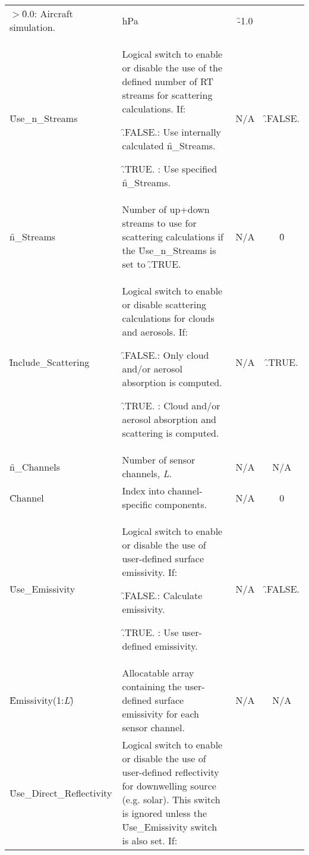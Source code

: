 \begin{longtable}{l p{8.5cm} c c}
{                 \hspace{0.5cm}$>$\f{0.0}: Aircraft simulation.\\}
     & hPa & \f{-1.0} \\
    \f{Use\_n\_Streams}              & Logical switch to enable or disable the use of the defined number of RT streams for scattering calculations. If:

    \parbox{7cm}{\hspace{0.5cm}\f{.FALSE.}: Use internally calculated \f{n\_Streams}.
    
                 \hspace{0.5cm}\f{.TRUE. }: Use specified \f{n\_Streams}.\\}
     & N/A & \f{.FALSE.} \\
    \f{n\_Streams}                   & Number of up+down streams to use for scattering calculations if the \f{Use\_n\_Streams} is set to \f{.TRUE.}
     & N/A & \f{0} \\[0.3cm]
    \f{Include\_Scattering}          & Logical switch to enable or disable scattering calculations for clouds and aerosols. If:

    \parbox{7cm}{\hspace{0.5cm}\f{.FALSE.}: Only cloud and/or aerosol absorption is computed.
    
                 \hspace{0.5cm}\f{.TRUE. }: Cloud and/or aerosol absorption and scattering is computed.\\}
     & N/A & \f{.TRUE.} \\
    \f{n\_Channels}                  & Number of sensor channels, \textit{L}. & N/A & N/A \\[0.3cm]
    \f{Channel}                      & Index into channel-specific components. & N/A & 0 \\[0.3cm]
    \f{Use\_Emissivity}              & Logical switch to enable or disable the use of user-defined surface emissivity. If:

    \parbox{7cm}{\hspace{0.5cm}\f{.FALSE.}: Calculate emissivity.
    
                 \hspace{0.5cm}\f{.TRUE. }: Use user-defined emissivity.\\}
     & N/A & \f{.FALSE.} \\
    \f{Emissivity(}1:\textit{L}\f{)} & Allocatable array containing the user-defined surface emissivity for each sensor channel. & N/A & N/A \\[0.8cm]
    \f{Use\_Direct\_Reflectivity}   & Logical switch to enable or disable the use of user-defined reflectivity for downwelling source (e.g. solar). This switch is ignored unless the \f{Use\_Emissivity} switch is also set. If:


\end{longtable}
